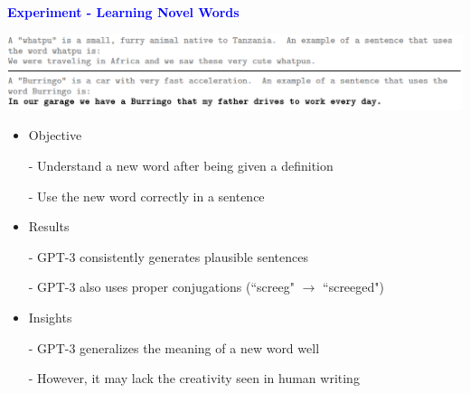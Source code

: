 \documentclass[professionalfont]{beamer}
\begin{document}
\begin{frame}

\begin{center}
    { \textbf{\textcolor{blue}{ {\fontsize{12}{14}\selectfont Experiment - Learning Novel Words} }} }
\end{center}

\begin{center}
    \includegraphics[width=1.0\textwidth]{figure/3-16.png}
\end{center}

{\fontsize{10}{14}\selectfont 
\begin{itemize}
    \item Objective

    - Understand a new word after being given a definition

    - Use the new word correctly in a sentence

    \item Results

    - GPT-3 consistently generates plausible sentences

    - GPT-3 also uses proper conjugations (``screeg" \( \rightarrow \) ``screeged")

    \item Insights

    - GPT-3 generalizes the meaning of a new word well

    - However, it may lack the creativity seen in human writing

\end{itemize}
}

\end{frame}
\end{document}
